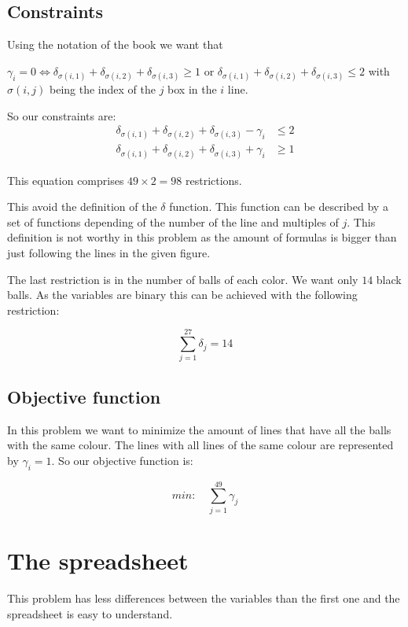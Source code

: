 \documentclass[12pt,a4paper]{report}
\begin{document}
\subsection{Constraints}

Using the notation of the book we want that 

$\gamma_i = 0 \Leftrightarrow \delta_{\sigma(i,1)} + \delta_{\sigma(i,2)} + \delta_{\sigma(i,3)} \geq 1 $ or $\delta_{\sigma(i,1)} + \delta_{\sigma(i,2)} + \delta_{\sigma(i,3)} \leq 2$ with $\sigma(i,j)$ being the index of the $j$ box in the $i$ line.

So our constraints are:
\begin{align}
\delta_{\sigma(i,1)} + \delta_{\sigma(i,2)} + \delta_{\sigma(i,3)} - \gamma_i &\leq 2\\
\delta_{\sigma(i,1)} + \delta_{\sigma(i,2)} + \delta_{\sigma(i,3)} + \gamma_i &\geq 1
\end{align}

This equation comprises $49\times 2 = 98$ restrictions.

This avoid the definition of the $\delta$ function. This function can be described by a set of functions depending of the number of the line and multiples of $j$. This definition is not worthy in this problem as the amount of formulas is bigger than just following the lines in the given figure.

The last restriction is in the number of balls of each color. We want only $14$ black balls. As the variables are binary this can be achieved with the following restriction:

\begin{equation}
\sum_{j=1}^{27} \delta_j = 14
\end{equation}

\subsection{Objective function}
In this problem we want to minimize the amount of lines that have all the balls with the same colour. The lines with all lines of the same colour are represented by $\gamma_i = 1$. So our objective function is:

\begin{equation}
min:\quad \sum_{j=1}^{49} \gamma_j
\end{equation}
\section{The spreadsheet}
This problem has less differences between the variables than the first one and the spreadsheet is easy to understand.
\end{document}

